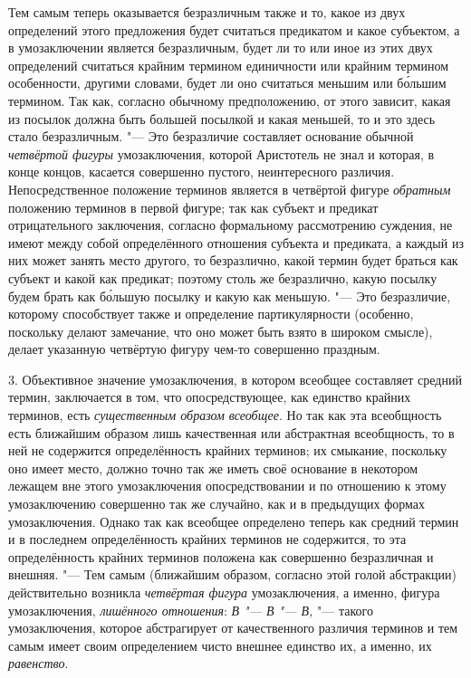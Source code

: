 Тем самым теперь оказывается безразличным также и то, какое из
двух определений этого предложения будет считаться предикатом и какое
субъектом, а в умозаключении является безразличным, будет ли то или иное из
этих двух определений считаться крайним термином единичности или крайним
термином особенности, другими словами, будет ли оно считаться меньшим или
б\'{о}льшим термином. Так как, согласно обычному предположению, от этого
зависит, какая из посылок должна быть большей посылкой и какая меньшей, то
и это здесь стало безразличным. "--- Это безразличие составляет
основание обычной {\em четвёртой фигуры} умозаключения,
которой Аристотель не знал и которая,
в конце концов, касается совершенно пустого, неинтересного различия.
Непосредственное положение терминов является в четвёртой фигуре
{\em обратным} положению
терминов в первой фигуре; так как субъект и предикат отрицательного
заключения, согласно формальному рассмотрению суждения, не имеют между
собой определённого отношения субъекта и предиката, а каждый из них может
занять место другого, то безразлично, какой термин будет браться как
субъект и какой как предикат; поэтому столь же безразлично, какую посылку
будем брать как б\'{о}льшую посылку и какую как меньшую. "---
Это безразличие, которому способствует также и определение
партикулярности (особенно, поскольку делают замечание, что оно может быть
взято в широком смысле), делает указанную четвёртую фигуру чем-то
совершенно праздным.

3. Объективное значение умозаключения, в котором всеобщее
составляет средний термин, заключается в том, что опосредствующее, как
единство крайних терминов, есть
{\em существенным образом всеобщее}.
Но так как эта всеобщность есть ближайшим образом лишь
качественная или абстрактная всеобщность, то в ней не содержится
определённость крайних терминов; их смыкание, поскольку оно имеет место,
должно точно так же иметь своё основание в некотором лежащем вне этого
умозаключения опосредствовании и по отношению к этому умозаключению
совершенно так же случайно, как и в предыдущих формах умозаключения. Однако
так как всеобщее определено теперь как средний термин и в последнем
определённость крайних терминов не содержится, то эта определённость
крайних терминов положена как совершенно безразличная и внешняя. "---
Тем самым (ближайшим образом, согласно этой голой
абстракции) действительно возникла
{\em четвёртая фигура}
умозаключения, а именно, фигура умозаключения,
{\em лишённого отношения}:
{\em В "--- В
"--- В,} "--- такого умозаключения, которое
абстрагирует от качественного различия терминов и тем самым имеет своим
определением чисто внешнее единство их, а именно, их
{\em равенство}.

